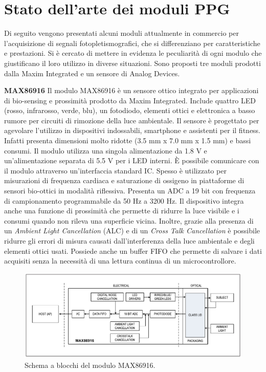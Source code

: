 \section{Stato dell'arte dei moduli PPG}
Di seguito vengono presentati alcuni moduli attualmente in commercio per l'acquisizione di segnali fotopletismografici, che si differenziano per caratteristiche e prestazioni. Si è cercato di mettere in evidenza le peculiarità di ogni modulo che giustificano il loro utilizzo in diverse situazioni. Sono proposti tre moduli prodotti dalla Maxim Integrated e un sensore di Analog Devices.

\textbf{MAX86916} Il modulo MAX86916 è un sensore ottico integrato per applicazioni di bio-sensing e prossimità prodotto da Maxim Integrated\cite{IntegratedMAX86916}. Include quattro LED (rosso, infrarosso, verde, blu), un fotodiodo, elementi ottici e elettronica a basso rumore per circuiti di rimozione della luce ambientale. Il sensore è progettato per agevolare l'utilizzo in dispositivi indossabili, smartphone e assistenti per il fitness. Infatti presenta dimensioni molto ridotte (3.5 mm x 7.0 mm x 1.5 mm) e bassi consumi. Il modulo utilizza una singola alimentazione da 1.8 V e un'alimentazione separata di 5.5 V per i LED interni. \`E possibile comunicare con il modulo attraverso un'interfaccia standard IC. Spesso è utilizzato per misurazioni di frequenza cardiaca e saturazione di ossigeno in piattaforme di sensori bio-ottici in modalità riflessiva. Presenta un ADC a 19 bit con frequenza di campionamento programmabile da 50 Hz a 3200 Hz. Il dispositivo integra anche una funzione di prossimità che permette di ridurre la luce visibile e i consumi quando non rileva una superficie vicina. Inoltre, grazie alla presenza di un \textit{Ambient Light Cancellation} (ALC) e di un \textit{Cross Talk Cancellation} è possibile ridurre gli errori di misura causati dall'interferenza della luce ambientale e degli elementi ottici usati. Possiede anche un buffer FIFO che permette di salvare i dati acquisiti senza la necessità di una lettura continua di un microcontrollore.
\begin{figure}[h]
	\centering
	\includegraphics[width=1\linewidth]{ImageFiles/Fotopletismografia/MAX86916BlockDiagram}
	\caption{Schema a blocchi del modulo MAX86916.}
	\label{fig:MAX86916BlockDiagram}
\end{figure}

